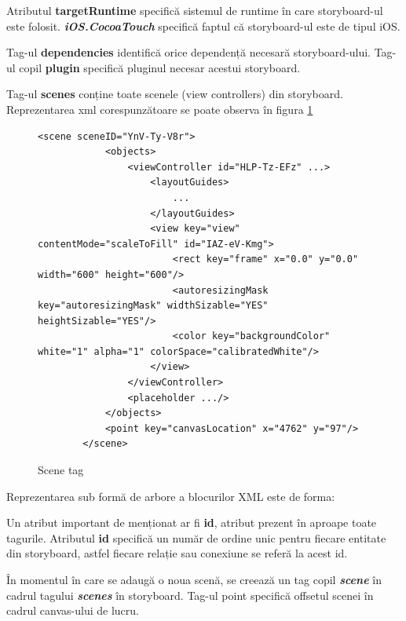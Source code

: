 Atributul \textbf{targetRuntime}  specifică sistemul de runtime în care storyboard-ul este folosit. \textbf{\textit{iOS.CocoaTouch}} specifică faptul că storyboard-ul este de tipul iOS.

Tag-ul \textbf{dependencies} identifică orice dependență necesară storyboard-ului. Tag-ul copil \textbf{plugin} specifică pluginul necesar acestui storyboard.

Tag-ul \textbf{scenes} conține toate scenele (view controllers) din storyboard. Reprezentarea xml corespunzătoare se poate observa în figura \ref{fig:scene}

\begin{figure}[!htbp]
\lstset{language=XML}
\begin{lstlisting}
<scene sceneID="YnV-Ty-V8r">
            <objects>
                <viewController id="HLP-Tz-EFz" ...>
                    <layoutGuides>
                        ...
                    </layoutGuides>
                    <view key="view" contentMode="scaleToFill" id="IAZ-eV-Kmg">
                        <rect key="frame" x="0.0" y="0.0" width="600" height="600"/>
                        <autoresizingMask key="autoresizingMask" widthSizable="YES" heightSizable="YES"/>
                        <color key="backgroundColor" white="1" alpha="1" colorSpace="calibratedWhite"/>
                    </view>
                </viewController>
                <placeholder .../>
            </objects>
            <point key="canvasLocation" x="4762" y="97"/>
        </scene>
\end{lstlisting}
\caption{Scene tag}\label{fig:scene}
\end{figure}

Reprezentarea sub formă de arbore a blocurilor XML este de forma:


Un atribut important de menționat ar fi \textbf{id}, atribut prezent în aproape toate tagurile. Atributul \textbf{id} specifică un număr de ordine unic pentru fiecare entitate din storyboard, astfel fiecare relație sau conexiune se referă la acest id.

În momentul în care se adaugă o noua scenă, se creează un tag copil \textbf{\textit{scene}} în cadrul tagului \textbf{\textit{scenes}} în storyboard. Tag-ul point specifică offsetul scenei în cadrul canvas-ului de lucru.

